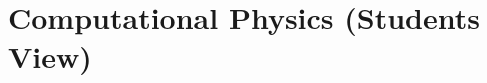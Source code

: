 \documentclass[master.tex]{subfiles}
\begin{document}
\chapter{Computational Physics (Students View)}
\end{document}
